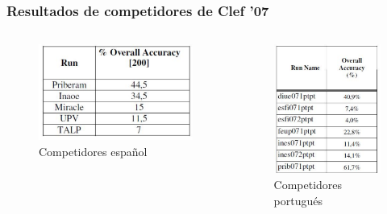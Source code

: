 \begin{frame}
\frametitle{Resultados de competidores de Clef '07}

\begin{columns}[T] %
\begin{column}{.48\textwidth}
  \begin{figure}
      \includegraphics[scale=0.4]{graficos/resultados-espaniol-resumen}
    \caption{Competidores español}
  \end{figure}
\end{column}%
\hfill%
\begin{column}{.48\textwidth}

  \begin{figure}
      \includegraphics[scale=0.4]{graficos/resultados-portugues}
    \caption{Competidores portugués}
  \end{figure}
\end{column}%
\end{columns}

\end{frame}


